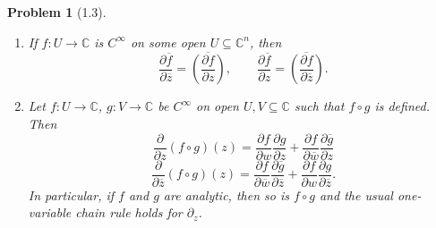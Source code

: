 \documentclass[11pt, letterpaper]{article}
\theoremstyle{plain}
\newtheorem{problem}{Problem}
\begin{document}
\begin{problem}[1.3]
	\begin{enumerate}[label=(\roman*)]
		\item If $f : U \to \mathbb{C} $ is $C^\infty $ on some open $U\subseteq \mathbb{C} ^n$, then
			\[
				\frac{\partial \overline{f} }{\partial \overline{z} } =\overline{\left(\frac{\partial f}{\partial z}\right) } ,\qquad \frac{\partial \overline{f} }{\partial z} = \overline{\left(\frac{\partial f}{\partial \overline{z} } \right)} 
			.\]
		\item Let $f : U \to \mathbb{C} $, $g : V \to \mathbb{C} $ be $C^\infty $ on open $U,V\subseteq \mathbb{C} $ such that $f\circ g$ is defined. Then
			\[
				\frac{\partial }{\partial z} (f\circ g)(z)=\frac{\partial f}{\partial w} \frac{\partial g}{\partial z} +\frac{\partial f}{\partial \overline{w} } \frac{\partial \overline{g} }{\partial z} 
			\]
			\[
				\frac{\partial }{\partial \overline{z} } (f\circ g)(z)=\frac{\partial f}{\partial \overline{w} } \frac{\partial \overline{g} }{\partial \overline{z}} +\frac{\partial f}{\partial w} \frac{\partial g}{\partial \overline{z} } 
			.\]
			In particular, if $f$ and $g$ are analytic, then so is $f\circ g$ and the usual one-variable chain rule holds for $\partial _z$.
	\end{enumerate}
\end{problem}
\end{document}
